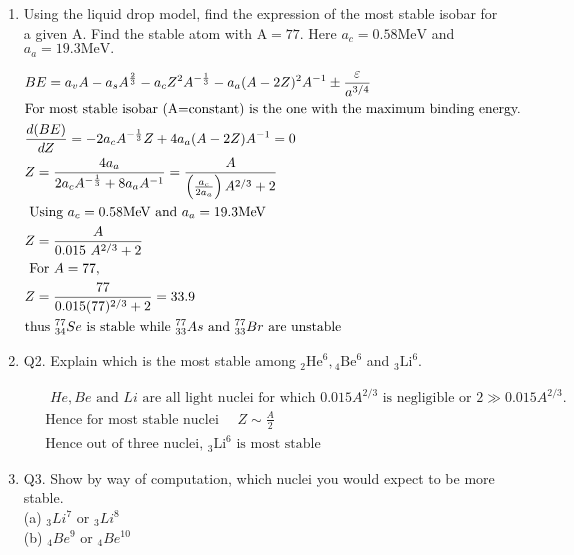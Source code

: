 \begin{enumerate}
	\item  Using the liquid drop model, find the expression of the most stable isobar for a given A. Find the stable atom with $\mathrm{A}=77$. Here $a_c=0.58 \mathrm{MeV}$ and $a_a=19.3 \mathrm{MeV} . $
	\begin{answer}
		\begin{align*}
		&B E=a_v A-a_s A^{\frac{2}{3}}-a_c Z^2 A^{-\frac{1}{3}}-a_a(A-2 Z)^2 A^{-1} \pm \frac{{\varepsilon}}{a^{3/4}}\\
		&\text{For most stable isobar (A=constant) is the one with the maximum binding energy. }\\
		&\frac{d(B E)}{d Z}=-2 a_c A^{-\frac{1}{3}} Z+4 a_a(A-2 Z) A^{-1}=0\\
		&Z=\frac{4 a_a}{2 a_c A^{-\frac{1}{3}}+8 a_{a} A^{-1}}=\frac{A}{\left(\frac{a_c}{2a_a}\right) A^{2 / 3}+2}\\
		&\text { Using } a_c=0.58 \mathrm{MeV} \text { and } a_a=19.3 \mathrm{MeV}\\
		&Z=\frac{A}{0.015 \ A^{2/3}+2}\\
		&\text { For } A=77 \text {, }\\
		&Z=\frac{77}{0.015(77)^{2 / 3}+2}=33.9\\
		&\text{thus ${}^{77}_{34}Se$ is stable while ${}^{77}_{33}As$ and $ {}^{77}_{33}Br$ are unstable}
		\end{align*}
	\end{answer}
\item Q2. Explain which is the most stable among ${ }_2 \mathrm{He}^6,{ }_4 \mathrm{Be}^6$ and ${ }_3 \mathrm{Li}^6$.
	\begin{answer}
	\begin{align*}
	&\text{ $H e, B e$ and $L i$ are all light nuclei for which $0.015 A^{2 / 3}$ is negligible or $2 \gg 0.015 A^{2 / 3}$.}\\
	&\text{	Hence for most stable nuclei $\quad Z \sim \frac{A}{2}$}\\
	&\text{	Hence out of three nuclei, ${ }_3 \mathrm{Li}^6$ is most stable}
	\end{align*}
\end{answer}
\item Q3. Show by way of computation, which nuclei you would expect to be more stable.\\
(a) ${ }_3 L i^7$ or ${ }_3 L i^8$\\
(b) ${ }_4 B e^9$ or ${ }_4 B e^{10}$ 
\begin{answer}
	\begin{align*}

\end{align*}
\end{answer}
\end{enumerate}
